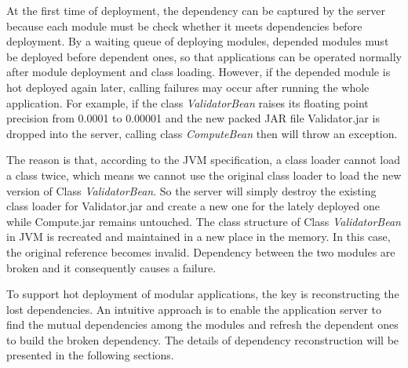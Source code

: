 \documentclass[conference]{IEEEtran}
\begin{document}
At the first time of deployment, the dependency can be captured by the server because each module must be check whether it meets dependencies before deployment. By a waiting queue of deploying modules, depended modules must be deployed before dependent ones, so that applications can be operated normally after module deployment and class loading. However, if the depended module is hot deployed again later, calling failures may occur after running the whole application. For example, if the class \emph{ValidatorBean} raises its floating point precision from 0.0001 to 0.00001 and the new packed JAR file Validator.jar is dropped into the server, calling class \emph{ComputeBean} then will throw an exception. 

The reason is that, according to the JVM specification\cite{jvm_specification}, a class loader cannot load a class twice, which means we cannot use the original class loader to load the new version of Class \emph{ValidatorBean}. So the server will simply destroy the existing class loader for Validator.jar and create a new one for the lately deployed one while Compute.jar remains untouched. The class structure of Class \emph{ValidatorBean} in JVM is recreated and maintained in a new place in the memory. In this case, the original reference becomes invalid. Dependency between the two modules are broken and it consequently causes a failure.

To support hot deployment of modular applications, the key is reconstructing the lost dependencies.
An intuitive approach is to enable the application server to find the mutual dependencies among the modules and refresh the dependent ones to build the broken dependency.
The details of dependency reconstruction will be presented in the following sections.



\end{document}
